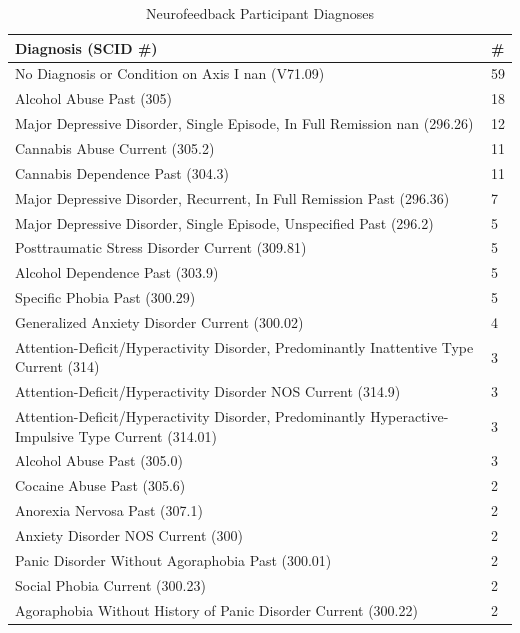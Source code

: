 \documentclass{bmcart}
\begin{document}
\begin{table}[h!]
\caption{Neurofeedback Participant Diagnoses}
      \begin{tabular}{ p{6.0cm}|p{0.8cm} }
        Diagnosis (SCID \#) & \# \\ \hline
        No Diagnosis or Condition on Axis I nan (V71.09) & 59  \\ \hline
        Alcohol Abuse Past (305) & 18  \\ \hline
        Major Depressive Disorder, Single Episode, In Full Remission nan (296.26) & 12  \\ \hline
        Cannabis Abuse Current (305.2) & 11  \\ \hline
        Cannabis Dependence Past (304.3) & 11  \\ \hline
        Major Depressive Disorder, Recurrent, In Full Remission Past (296.36) & 7  \\ \hline
        Major Depressive Disorder, Single Episode, Unspecified Past (296.2) & 5  \\ \hline
        Posttraumatic Stress Disorder Current (309.81) & 5  \\ \hline
        Alcohol Dependence Past (303.9) & 5  \\ \hline
        Specific Phobia Past (300.29) & 5  \\ \hline
        Generalized Anxiety Disorder Current (300.02) & 4  \\ \hline
        Attention-Deficit/Hyperactivity Disorder, Predominantly Inattentive Type Current (314) & 3  \\ \hline
        Attention-Deficit/Hyperactivity Disorder NOS Current (314.9) & 3  \\ \hline
        Attention-Deficit/Hyperactivity Disorder, Predominantly Hyperactive-Impulsive Type Current (314.01) & 3  \\ \hline
        Alcohol Abuse Past (305.0) & 3  \\ \hline
        Cocaine Abuse Past (305.6) & 2  \\ \hline
        Anorexia Nervosa Past (307.1) & 2  \\ \hline
        Anxiety Disorder NOS Current (300) & 2  \\ \hline
        Panic Disorder Without Agoraphobia Past (300.01) & 2  \\ \hline
        Social Phobia Current (300.23) & 2  \\ \hline
        Agoraphobia Without History of Panic Disorder Current (300.22) & 2  \\ \hline

\end{tabular}
\end{table}
\end{document}
